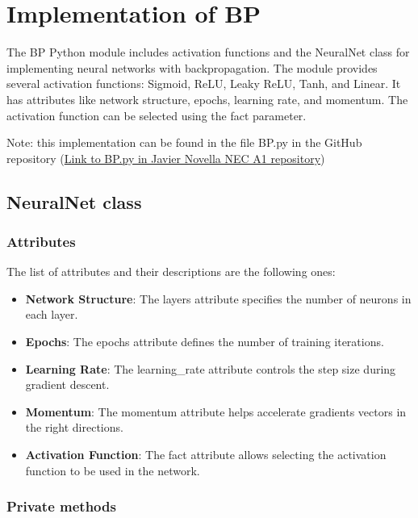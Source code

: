 \documentclass[11pt, a4paper]{article}
\begin{document}
\section{Implementation of BP}

The BP Python module includes activation functions and the NeuralNet class for implementing neural networks with backpropagation. The module provides 
several activation functions: Sigmoid, ReLU, Leaky ReLU, Tanh, and Linear.  It has attributes like network structure, epochs, learning rate, and momentum. 
The activation function can be selected using the fact parameter.

\vspace{1em} Note: this implementation can be found in the file BP.py in the GitHub repository 
(\href{https://github.com/novella93/NEC_A1/blob/main/BP.py}{Link to BP.py in Javier Novella NEC A1 repository})

\subsection{NeuralNet class}

\subsubsection{Attributes}

The list of attributes and their descriptions are the following ones:

\begin{itemize}
    \item \textbf{Network Structure}: The layers attribute specifies the number of neurons in each layer.
    \item \textbf{Epochs}: The epochs attribute defines the number of training iterations.
    \item \textbf{Learning Rate}: The learning\_rate attribute controls the step size during gradient descent.
    \item \textbf{Momentum}: The momentum attribute helps accelerate gradients vectors in the right directions.
    \item \textbf{Activation Function}: The fact attribute allows selecting the activation function to be used in the network.
\end{itemize}

\subsubsection{Private methods}
\end{document}
